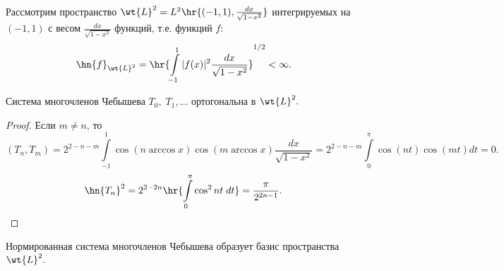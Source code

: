 \documentclass[a4paper]{article}
\begin{document}
Рассмотрим пространство
$\wt{L}^2=L^2\hr{(-1,1),\frac{dx}{\sqrt{1-x^2}}}$
интегрируемых на $(-1,1)$ с весом $\frac{dx}{\sqrt{1-x^2}}$
функций, т.е. функций $f$:
$$\hn{f}_{\wt{L}^2}=\hr{\int\limits_{-1}^1|f(x)|^2\frac{dx}{\sqrt{1-x^2}}}^{1/2}<\infty.$$
\begin{theorem}
Система многочленов Чебышева $T_0,\;T_1,\dots$ ортогональна в
$\wt{L}^2.$
\end{theorem}
\begin{proof}
  Если $m\neq n$, то
  $$(T_n,T_m)=2^{2-n-m}\int\limits_{-1}^1\cos(n\arccos
  x)\cos(m\arccos
  x)\frac{dx}{\sqrt{1-x^2}}=2^{2-n-m}\int\limits_0^{\pi}\cos(nt)\cos(mt)dt=0.$$
  $$\hn{T_n}^2=2^{2-2n}\hr{\int\limits_0^{\pi}\cos^2nt\;dt}=\frac{\pi}{2^{2n-1}}.$$
\end{proof}
\begin{theorem}
Нормированная система многочленов Чебышева образует базис
пространства $\wt{L}^2.$
\end{theorem}
\end{document}
